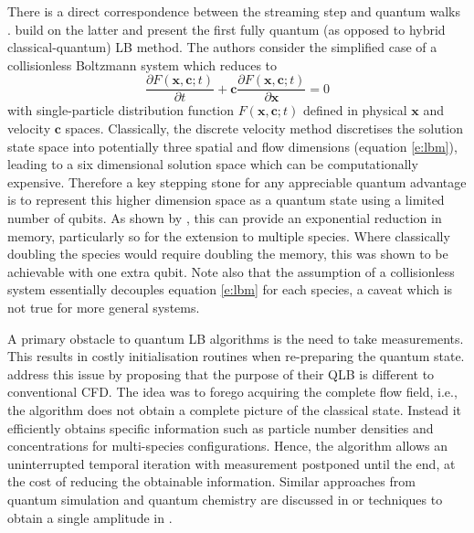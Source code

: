\documentclass[10pt]{iopart}
\begin{document}
There is a direct correspondence between the streaming step and quantum walks \cite{succi2015quantum}. \citeauthor{Todorova2020} \cite{Todorova2020} build on the latter and present the first fully quantum (as opposed to hybrid classical-quantum) LB method. The authors consider the simplified case of a collisionless Boltzmann system which reduces to
\begin{equation}\label{e:lbm}
\frac{\partial F (\mathbf{x},\mathbf{c};t)}{\partial t} + \mathbf{c} \frac{\partial F(\mathbf{x},\mathbf{c};t)}{\partial \mathbf{x}}=0
\end{equation}
with single-particle distribution function $F(\mathbf{x},\mathbf{c};t)$ defined in physical $\mathbf{x}$ and velocity $\mathbf{c}$ spaces. Classically, the discrete velocity method discretises the solution state space into potentially three spatial and flow dimensions (equation \ref{e:lbm}), leading to a six dimensional solution space which can be computationally expensive. Therefore a key stepping stone for any appreciable quantum advantage is to represent this higher dimension space as a quantum state using a limited number of qubits. As shown by \citeauthor{Todorova2020}, this can provide an exponential reduction in memory, particularly so for the extension to multiple species. Where classically doubling the species would require doubling the memory, this was shown to be achievable with one extra qubit. Note also that the assumption of a collisionless system essentially decouples equation \ref{e:lbm} for each species, a caveat which is not true for more general systems. 

A primary obstacle to quantum LB algorithms is the need to take measurements. This results in costly initialisation routines when re-preparing the quantum state.
\citeauthor{Todorova2020} \cite{Todorova2020} address this issue by proposing that the purpose of their QLB is different to conventional CFD. The idea was to forego acquiring the complete flow field, i.e., the algorithm does not obtain a complete picture of the classical state. Instead it efficiently obtains specific information such as particle number densities and concentrations for multi-species configurations. Hence, the algorithm allows an uninterrupted temporal iteration with measurement postponed until the end, at the cost of reducing the obtainable information. Similar approaches from quantum simulation and quantum chemistry are discussed in \cite{ortiz2001quantum,somma2002simulating} or techniques to obtain a single amplitude in \cite{Brassard2002}.
\end{document}
